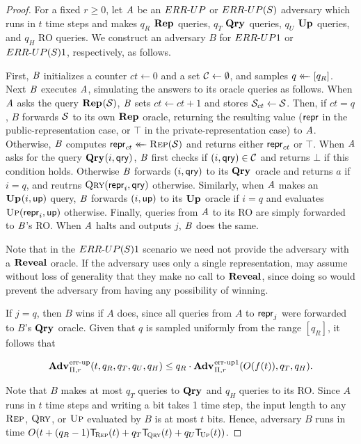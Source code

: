 \begin{proof}
For a fixed $r \ge 0$, let $\mathit{A}$ be an ${ERR\mbox{-}UP}$ or ${ERR\mbox{-}UP(S)}$ adversary which runs in $t$ time steps and makes $q_R$ $\textup{\textbf{Rep}}\hspace{0.5pt}$ queries, $q_T$ $\textup{\textbf{Qry}}\hspace{0.5pt}$ queries, $q_U$ $\textup{\textbf{Up}}\hspace{0.5pt}$ queries, and $q_H$ RO queries. We construct an adversary $B$ for ${ERR\mbox{-}UP}1$ or ${ERR\mbox{-}UP(S)}1$, respectively, as follows.

First, $\mathit{B}$ initializes a counter $ct \gets 0$ and a set $\mathcal{C} \gets \emptyset$, and samples $q \mathrel{\leftarrow\mkern-14mu\leftarrow} [q_R]$. Next $\mathit{B}$ executes $\mathit{A}$, simulating the answers to its oracle queries as follows. When $\mathit{A}$ asks the query $\textup{\textbf{Rep}}\hspace{0.5pt}(\mathcal{S})$, $\mathit{B}$ sets $ct \gets ct + 1$ and stores $\mathcal{S}_{ct} \gets \mathcal{S}$. Then, if $ct = q$, $B$ forwards $\mathcal{S}$ to its own $\textup{\textbf{Rep}}\hspace{0.5pt}$ oracle, returning the resulting value ($\mathsf{repr}$ in the public-representation case, or $\top$ in the private-representation case) to $\mathit{A}$. Otherwise, $\mathit{B}$ computes $\mathsf{repr}_{ct} \mathrel{\leftarrow\mkern-14mu\leftarrow} \textnormal{\textsc{Rep}}(\mathcal{S})$ and returns either $\mathsf{repr}_{ct}$ or $\top$. When $\mathit{A}$ asks for the query $\textup{\textbf{Qry}}\hspace{0.5pt}(i,\mathsf{qry})$, $\mathit{B}$ first checks if $(i,\mathsf{qry}) \in \mathcal{C}$ and returns $\bot$ if this condition holds. Otherwise $\mathit{B}$ forwards $(i,\mathsf{qry})$ to its $\textup{\textbf{Qry}}\hspace{0.5pt}$ oracle and returns $a$ if $i = q$, and reutrns $\textnormal{\textsc{Qry}}(\mathsf{repr}_i,\mathsf{qry})$ otherwise. Similarly, when $\mathit{A}$ makes an $\textup{\textbf{Up}}\hspace{0.5pt}(i,\mathsf{up})$ query, $\mathit{B}$ forwards $(i,\mathsf{up})$ to its $\textup{\textbf{Up}}\hspace{0.5pt}$ oracle if $i = q$ and evaluates $\textnormal{\textsc{Up}}(\mathsf{repr}_i,\mathsf{up})$ otherwise. Finally, queries from $\mathit{A}$ to its RO are simply forwarded to $\mathit{B}$'s RO. When $\mathit{A}$ halts and outputs $j$, $\mathit{B}$ does the same.

Note that in the ${ERR\mbox{-}UP(S)}1$ scenario we need not provide the adversary with a $\mathbf{Reveal}$ oracle. If the adversary uses only a single representation, may assume without loss of generality that they make no call to $\mathbf{Reveal}$, since doing so would prevent the adversary from having any possibility of winning.

If $j = q$, then $B$ wins if $A$ does, since all queries from $A$ to $\mathsf{repr}_j$ were forwarded to $B$'s $\textup{\textbf{Qry}}\hspace{0.5pt}$ oracle. Given that $q$ is sampled uniformly from the range $[q_R]$, it follows that

$$\Adv{\errep}_{\struct,r}(t, q_R, q_T, q_U, q_H) \leq q_R\cdot\Adv{\errep1}_{\struct,r}(O(f(t)), q_T, q_H).$$

Note that $B$ makes at most $q_T$ queries to $\textup{\textbf{Qry}}\hspace{0.5pt}$ and $q_H$ queries to its RO. Since $A$ runs in $t$ time steps and writing a bit takes 1 time step, the input length to any $\textnormal{\textsc{Rep}}$, $\textnormal{\textsc{Qry}}$, or $\textnormal{\textsc{Up}}$ evaluated by $B$ is at most $t$ bits. Hence, adversary $B$ runs in time $O(t+(q_R-1)\ticks(\Rep,t)+q_T\ticks(\Qry,t)+q_U\ticks(\Up,t))$.
\end{proof}